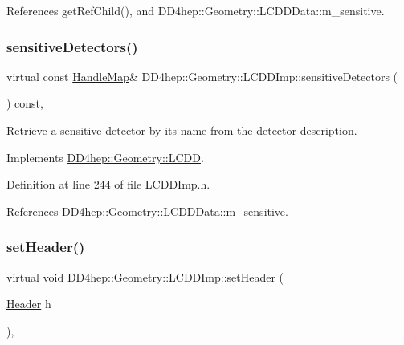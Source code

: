 References get\+Ref\+Child(), and D\+D4hep\+::\+Geometry\+::\+L\+C\+D\+D\+Data\+::m\+\_\+sensitive.

\hypertarget{class_d_d4hep_1_1_geometry_1_1_l_c_d_d_imp_abe81e9e0c070665c809067d61dac3784}{}\label{class_d_d4hep_1_1_geometry_1_1_l_c_d_d_imp_abe81e9e0c070665c809067d61dac3784} 
\subsubsection{\texorpdfstring{sensitive\+Detectors()}{sensitiveDetectors()}}
{\footnotesize\ttfamily virtual const \hyperlink{class_d_d4hep_1_1_geometry_1_1_l_c_d_d_a05cb11e7355772c7b0794bcca59bf477}{Handle\+Map}\& D\+D4hep\+::\+Geometry\+::\+L\+C\+D\+D\+Imp\+::sensitive\+Detectors (\begin{DoxyParamCaption}{ }\end{DoxyParamCaption}) const\hspace{0.3cm}{\ttfamily [inline]}, {\ttfamily [virtual]}}



Retrieve a sensitive detector by it\textquotesingle{}s name from the detector description. 



Implements \hyperlink{class_d_d4hep_1_1_geometry_1_1_l_c_d_d_a576c24cc18698eb14658466999fca65d}{D\+D4hep\+::\+Geometry\+::\+L\+C\+DD}.



Definition at line 244 of file L\+C\+D\+D\+Imp.\+h.



References D\+D4hep\+::\+Geometry\+::\+L\+C\+D\+D\+Data\+::m\+\_\+sensitive.

\hypertarget{class_d_d4hep_1_1_geometry_1_1_l_c_d_d_imp_af37d163b4c62d1ef1602555d39e0eff8}{}\label{class_d_d4hep_1_1_geometry_1_1_l_c_d_d_imp_af37d163b4c62d1ef1602555d39e0eff8} 
\subsubsection{\texorpdfstring{set\+Header()}{setHeader()}}
{\footnotesize\ttfamily virtual void D\+D4hep\+::\+Geometry\+::\+L\+C\+D\+D\+Imp\+::set\+Header (\begin{DoxyParamCaption}\item[{\hyperlink{class_d_d4hep_1_1_geometry_1_1_header}{Header}}]{h }\end{DoxyParamCaption})\hspace{0.3cm}{\ttfamily [inline]}, {\ttfamily [virtual]}}



